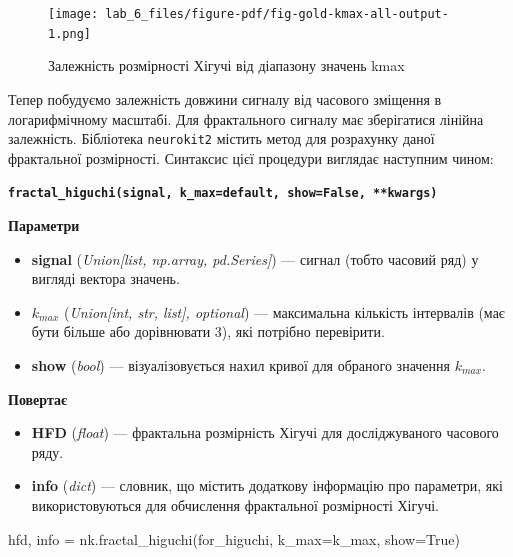 \documentclass[
  letterpaper,
]{report}
\newenvironment{Shaded}{\begin{snugshade}}{\end{snugshade}}
\newcommand{\NormalTok}[1]{\textcolor[rgb]{0.00,0.23,0.31}{#1}}
\newcommand{\OperatorTok}[1]{\textcolor[rgb]{0.37,0.37,0.37}{#1}}
\newcommand{\VariableTok}[1]{\textcolor[rgb]{0.07,0.07,0.07}{#1}}
\providecommand{\tightlist}{%
  \setlength{\itemsep}{0pt}\setlength{\parskip}{0pt}}\usepackage{longtable,booktabs,array}
\begin{document}
\begin{figure}[H]

{\centering \texttt{[image: lab\_6\_files/figure-pdf/fig-gold-kmax-all-output-1.png]}

}

\caption{\label{fig-gold-kmax-all}Залежність розмірності Хігучі від
діапазону значень kmax}

\end{figure}

Тепер побудуємо залежність довжини сигналу від часового зміщення в
логарифмічному масштабі. Для фрактального сигналу має зберігатися
лінійна залежність. Бібліотека \texttt{neurokit2} містить метод для
розрахунку даної фрактальної розмірності. Синтаксис цієї процедури
виглядає наступним чином:

\textbf{\texttt{fractal\_higuchi(signal,\ k\_max=\textquotesingle{}default\textquotesingle{},\ show=False,\ **kwargs)}}

\textbf{Параметри}

\begin{itemize}
\tightlist
\item
  \textbf{signal} (\emph{Union{[}list, np.array, pd.Series{]}}) ---
  сигнал (тобто часовий ряд) у вигляді вектора значень.
\item
  \textbf{\(k_{max}\)} (\emph{Union{[}int, str, list{]}, optional}) ---
  максимальна кількість інтервалів (має бути більше або дорівнювати 3),
  які потрібно перевірити.
\item
  \textbf{show} (\emph{bool}) --- візуалізовується нахил кривої для
  обраного значення \(k_{max}\).
\end{itemize}

\textbf{Повертає}

\begin{itemize}
\tightlist
\item
  \textbf{HFD} (\emph{float}) --- фрактальна розмірність Хігучі для
  досліджуваного часового ряду.
\item
  \textbf{info} (\emph{dict}) --- словник, що містить додаткову
  інформацію про параметри, які використовуються для обчислення
  фрактальної розмірності Хігучі.
\end{itemize}

\begin{Shaded}
\begin{Highlighting}[]
\NormalTok{hfd, info }\OperatorTok{=}\NormalTok{ nk.fractal\_higuchi(for\_higuchi, k\_max}\OperatorTok{=}\NormalTok{k\_max, show}\OperatorTok{=}\VariableTok{True}\NormalTok{)}
\end{Highlighting}
\end{Shaded}
\end{document}
